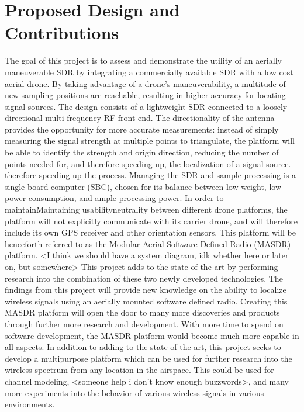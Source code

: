 \section{Proposed Design and Contributions}
The goal of this project is to assess and demonstrate the utility of an aerially maneuverable SDR by integrating a commercially available SDR with a low cost aerial drone. By taking advantage of a drone's maneuverability, a multitude of new sampling positions are reachable, resulting in higher accuracy for locating signal sources.
The design consists of a lightweight SDR connected to a loosely directional multi-frequency RF front-end. The directionality of the antenna provides the opportunity for more accurate measurements: instead of simply measuring the signal strength at multiple points to triangulate, the platform will be able to identify the strength and origin direction, reducing the number of points needed for, and therefore speeding up, the localization of a signal source. therefore speeding up the process. Managing the SDR and sample processing is a single board computer (SBC), chosen for its balance between low weight, low power consumption, and ample processing power. In order to maintainMaintaining usabilityneutrality between different drone platforms, the platform will not explicitly communicate with its carrier drone, and will therefore include its own GPS receiver and other orientation sensors. This platform will be henceforth referred to as the Modular Aerial Software Defined Radio (MASDR) platform. <I think we should have a system diagram, idk whether here or later on, but somewhere>
This project adds to the state of the art by performing research into the combination of these two newly developed technologies. The findings from this project will provide new knowledge on the ability to localize wireless signals using an aerially mounted software defined radio. Creating this MASDR platform will open the door to many more discoveries and products through further more research and development. With more time to spend on software development, the MASDR platform would become much more capable in all aspects.
In addition to adding to the state of the art, this project seeks to develop a multipurpose platform which can be used for further research into the wireless spectrum from any location in the airspace. This could be used for channel modeling, <someone help i don’t know enough buzzwords>, and many more experiments into the behavior of various wireless signals in various environments.
